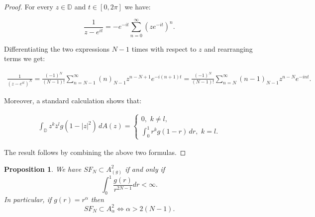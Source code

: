 \documentclass{amsart}[11pt]
\newcommand{\D}{\mathbb{D}} %
\newtheorem{proposition}[theorem]{Proposition}
\theoremstyle{definition}
\begin{document}
\begin{proof}
For every $z \in \D$ and $t \in [0,2\pi]$ we have:

\[ 
\frac{1}{z-e^{it}} = -e^{-it} \sum_{n=0}^{\infty}(ze^{-it})^n.
\]

Differentiating the two expressions $N-1$ times with respect to $z$ and rearranging terms we get:

\begin{gather}
\frac{1}{(z-e^{it})^N} = \frac{(-1)^N}{(N-1)!} \sum_{n=N-1}^{\infty}(n)_{N-1}z^{n-N+1}e^{-i(n+1)t} = \frac{(-1)^N}{(N-1)!}\sum_{n=N}^{\infty} (n-1)_{N-1} z^{n-N}e^{-int}.
\end{gather}

Moreover, a standard calculation shows that:

\begin{gather*}
\int_{\D} z^k \overline{z}^l g(1-|z|^2)\,dA(z) = 
\begin{cases}
0, \,\,k \neq l, \\
\int_0^1 r^k g(1-r)\,dr , \,\,k = l.
\end{cases}
\end{gather*}

The result follows by combining the above two formulas.
\end{proof}

\begin{proposition}
We have \( SF_N \subset A^2_{(g)} \) if and only if
\[
\int_{0}^{1} \frac{g(r)}{r^{2N-1}} dr < \infty.
\]
In particular, if \( g(r) = r^\alpha \) then
\[
SF_N \subset A^2_{\alpha} \iff \alpha > 2(N - 1).
\]
\end{proposition}
\end{document}
